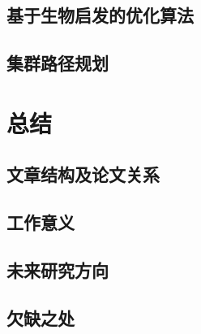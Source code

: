 \documentclass[conference]{IEEEtran}
\begin{document}
\subsection{基于生物启发的优化算法}


\subsection{集群路径规划}



\section{总结}


\subsection{文章结构及论文关系}


\subsection{工作意义}


\subsection{未来研究方向}


\subsection{欠缺之处}




\end{document}
